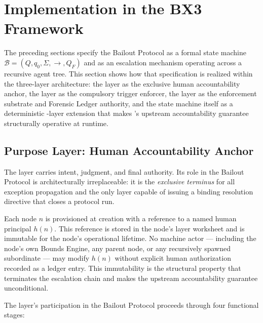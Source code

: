 \section{Implementation in the BX3 Framework}\label{sec:implementation}

The preceding sections specify the Bailout Protocol as a formal state machine $\mathcal{B}=(Q,q_0,\Sigma,\rightarrow,Q_F)$ and as an escalation mechanism operating across a recursive agent tree. This section shows how that specification is realized within the \bxthree{} three-layer architecture: the \purpose{} layer as the exclusive human accountability anchor, the \bounds{} layer as the compulsory trigger enforcer, the \fact{} layer as the enforcement substrate and Forensic Ledger authority, and the state machine itself as a deterministic \fact-layer extension that makes \bxthree{}'s upstream accountability guarantee structurally operative at runtime.

\subsection{Purpose Layer: Human Accountability Anchor}\label{sec:purpose-layer}

The \purpose{} layer carries intent, judgment, and final authority. Its role in the Bailout Protocol is architecturally irreplaceable: it is the \emph{exclusive terminus} for all exception propagation and the only layer capable of issuing a binding resolution directive that closes a protocol run.

Each \bxthree{} node $n$ is provisioned at creation with a reference to a named human principal $h(n)$. This reference is stored in the node's \purpose{} layer worksheet and is immutable for the node's operational lifetime. No machine actor — including the node's own Bounds Engine, any parent node, or any recursively spawned subordinate — may modify $h(n)$ without explicit human authorization recorded as a ledger entry. This immutability is the structural property that terminates the escalation chain and makes the upstream accountability guarantee unconditional.

The \purpose{} layer's participation in the Bailout Protocol proceeds through four functional stages:

